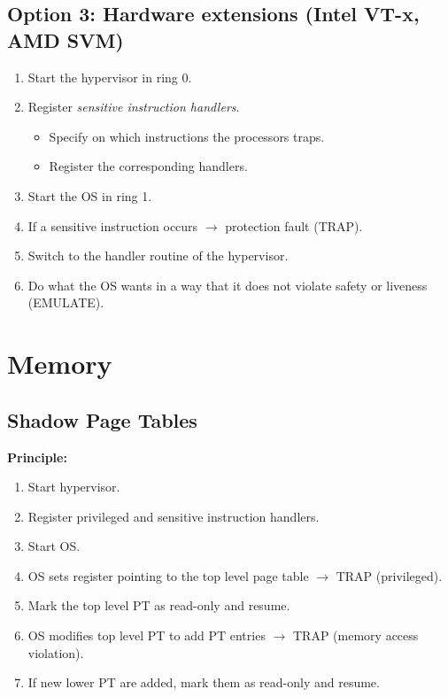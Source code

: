        \subsection{Option 3: Hardware extensions (Intel VT-x, AMD SVM)}
	        \begin{enumerate}
	        	\item Start the hypervisor in ring 0.
	        	\item Register \textit{sensitive instruction handlers}.
		        	\begin{itemize}
		        		\item Specify on which instructions the processors traps.
		        		\item Register the corresponding handlers.
		        	\end{itemize}
	        	\item Start the OS in ring 1.
	        	\item If a sensitive instruction occurs \(\rightarrow\) protection fault (TRAP).
	        	\item Switch to the handler routine of the hypervisor.
	        	\item Do what the OS wants in a way that it does not violate safety or liveness (EMULATE).
	        \end{enumerate}

    \section{Memory}
        \subsection{Shadow Page Tables}
            \textbf{Principle:}
            \begin{enumerate}
            	\item Start hypervisor.
            	\item Register privileged and sensitive instruction handlers.
            	\item Start OS.
            	\item OS sets register pointing to the top level page table \(\rightarrow\) TRAP (privileged).
            	\item Mark the top level PT as read-only and resume.
            	\item OS modifies top level PT to add PT entries \(\rightarrow\) TRAP (memory access violation).
            	\item If new lower PT are added, mark them as read-only and resume.
            \end{enumerate}
        
